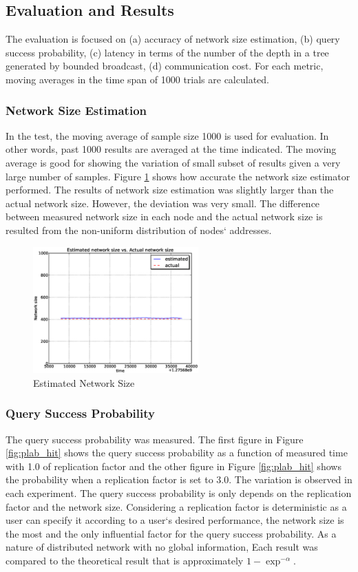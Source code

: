 \documentclass[9.5pt,journal,final,finalsubmission,twocolumn]{IEEEtran}
\begin{document}
\subsection{Evaluation and Results} \label{plab:result}
The evaluation is focused on (a) accuracy of network size estimation,
(b) query success probability, (c) latency in terms of the number of the depth 
in a tree generated by bounded broadcast, (d) communication cost.
For each metric, moving averages 
in the time span of 1000 trials are calculated.

\subsubsection{Network Size Estimation}
In the test, the moving average of sample 
size 1000 is used for evaluation. 
In other words, past 1000 results are averaged at the time indicated. 
The moving average is good for showing the variation of small subset 
of results given a very large number of samples.
Figure \ref{fig:e_net_size} shows how accurate the network 
size estimator performed.
The results of network size estimation was slightly larger than 
the actual network size. However, the deviation was very small.  
The difference between measured network size in each node and the actual
network size is resulted from the non-uniform distribution of nodes` 
addresses.

\begin{figure}[ht]
\centering
\includegraphics[width=2.5in]{plab_size}
\caption{Estimated Network Size}
\label{fig:e_net_size}
\end{figure}

\subsubsection{Query Success Probability}
The query success probability was measured. The first figure in 
Figure \ref{fig:plab_hit}
shows the query success probability as a function of measured time with
1.0 of replication factor and the other figure in Figure \ref{fig:plab_hit} 
shows the
probability when a replication factor is set to 3.0.
The variation is observed in each experiment. The query success 
probability is only depends on the replication factor and the 
network size. 
Considering a replication factor is deterministic as a user can specify it 
according to a user`s desired performance, 
the network size is the most and the only influential factor 
for the query success probability. 
As a nature of distributed network with no global information, 
Each result was compared to the theoretical result that is approximately
$1-\exp^{-\alpha}$.
 
\end{document}
